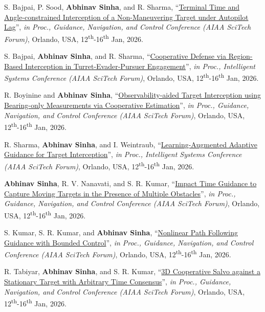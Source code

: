 {\begin{etaremune}[leftmargin=1cm]
		\item S. Bajpai, P. Sood, \textbf{Abhinav Sinha}, and R. Sharma, ``\href{https://arc.aiaa.org/doi/abs/10.2514/6.2026-2346}{Terminal Time and Angle-constrained Interception of a Non-Maneuvering Target under Autopilot Lag}'', \emph{in Proc., Guidance, Navigation, and Control Conference (AIAA SciTech Forum)}, Orlando, USA, 12\textsuperscript{th}-16\textsuperscript{th} Jan, 2026.
		\item S. Bajpai, \textbf{Abhinav Sinha}, and R. Sharma, ``\href{https://arc.aiaa.org/doi/abs/10.2514/6.2026-2196}{Cooperative Defense via Region-Based Interception in Turret-Evader-Pursuer Engagement}'', \emph{in Proc., Intelligent Systems Conference (AIAA SciTech Forum)}, Orlando, USA, 12\textsuperscript{th}-16\textsuperscript{th} Jan, 2026.
		\item R. Boyinine and \textbf{Abhinav Sinha}, ``\href{https://arc.aiaa.org/doi/abs/10.2514/6.2026-0122}{Observability-aided Target Interception using Bearing-only Measurements via Cooperative Estimation}'', \emph{in Proc., Guidance, Navigation, and Control Conference (AIAA SciTech Forum)}, Orlando, USA, 12\textsuperscript{th}-16\textsuperscript{th} Jan, 2026.
		\item R. Sharma, \textbf{Abhinav Sinha}, and I. Weintraub, ``\href{https://arc.aiaa.org/doi/abs/10.2514/6.2026-1202}{Learning-Augmented Adaptive Guidance for Target Interception}'', \emph{in Proc., Intelligent Systems Conference (AIAA SciTech Forum)}, Orlando, USA, 12\textsuperscript{th}-16\textsuperscript{th} Jan, 2026.
		\item \textbf{Abhinav Sinha}, R. V. Nanavati, and S. R. Kumar, ``\href{https://arc.aiaa.org/doi/abs/10.2514/6.2026-0121}{Impact Time Guidance to Capture Moving Targets in the Presence of Multiple Obstacles}'', \emph{in Proc., Guidance, Navigation, and Control Conference (AIAA SciTech Forum)}, Orlando, USA, 12\textsuperscript{th}-16\textsuperscript{th} Jan, 2026.
		\item S. Kumar, S. R. Kumar, and \textbf{Abhinav Sinha}, ``\href{https://arc.aiaa.org/doi/abs/10.2514/6.2026-1947}{Nonlinear Path Following Guidance with Bounded Control}'', \emph{in Proc., Guidance, Navigation, and Control Conference (AIAA SciTech Forum)}, Orlando, USA, 12\textsuperscript{th}-16\textsuperscript{th} Jan, 2026.
		\item R. Tabiyar, \textbf{Abhinav Sinha}, and S. R. Kumar, ``\href{https://arc.aiaa.org/doi/abs/10.2514/6.2026-0321}{3D Cooperative Salvo against a Stationary Target with Arbitrary Time Consensus}'', \emph{in Proc., Guidance, Navigation, and Control Conference (AIAA SciTech Forum)}, Orlando, USA, 12\textsuperscript{th}-16\textsuperscript{th} Jan, 2026.

\end{etaremune}}
